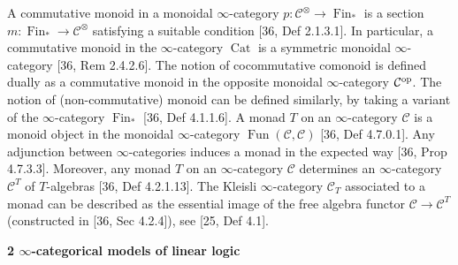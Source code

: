 \documentclass[10pt,a4paper]{article}
\begin{document}
A commutative monoid in a monoidal $\infty$-category $p:\mathcal{C}^{\otimes}\to\operatorname{Fin}_{\ast}$ is a section $m:\operatorname{Fin}_{\ast}\to\mathcal{C}^{\otimes}$ satisfying a suitable condition [36, Def 2.1.3.1]. In particular, a commutative monoid in the $\infty$-category $\operatorname{Cat}$ is a symmetric monoidal $\infty$-category [36, Rem 2.4.2.6]. The notion of cocommutative comonoid is defined dually as a commutative monoid in the opposite monoidal $\infty$-category $\mathcal{C}^{\textnormal{op}}$. The notion of (non-commutative) monoid can be defined similarly, by taking a variant of the $\infty$-category $\operatorname{Fin}_{\ast}$ [36, Def 4.1.1.6]. A monad $T$ on an $\infty$-category $\mathcal{C}$ is a monoid object in the monoidal $\infty$-category $\operatorname{Fun}(\mathcal{C},\mathcal{C})$ [36, Def 4.7.0.1]. Any adjunction between $\infty$-categories induces a monad in the expected way [36, Prop 4.7.3.3]. Moreover, any monad $T$ on an $\infty$-category $\mathcal{C}$ determines an $\infty$-category $\mathcal{C}^{T}$ of $T$-algebras [36, Def 4.2.1.13]. The Kleisli $\infty$-category $\mathcal{C}_{T}$ associated to a monad can be described as the essential image of the free algebra functor $\mathcal{C}\to\mathcal{C}^{T}$ (constructed in [36, Sec 4.2.4]), see [25, Def 4.1].\par
 
 
 


 
\par\medskip\noindent\textbf{2 $\infty$-categorical models of linear logic}\par
 
 
\end{document}
